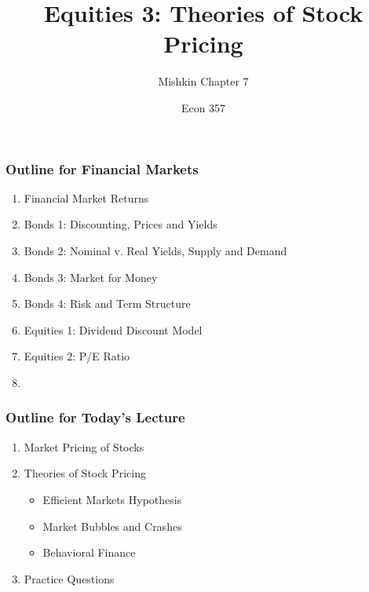 \documentclass{beamer}
\title{Equities 3: Theories of Stock Pricing}
\subtitle{Mishkin Chapter 7}
\author{Econ 357}
\date{\week}
\begin{document}
\frame{\titlepage}

\begin{frame}
    \frametitle{Outline for Financial Markets}
        \begin{enumerate}
            \item Financial Market Returns
            \item Bonds 1: Discounting, Prices and Yields
            \item Bonds 2: Nominal v. Real Yields, Supply and Demand
            \item Bonds 3: Market for Money
            \item Bonds 4: Risk and Term Structure
            \item Equities 1: Dividend Discount Model
            \item Equities 2: P/E Ratio
            \item {}
            
        \end{enumerate}
\end{frame}


\begin{frame}
    \frametitle{Outline for Today's Lecture}
    \begin{enumerate}
        \item Market Pricing of Stocks
        \item Theories of Stock Pricing
        \begin{itemize}
            \item Efficient Markets Hypothesis
            \item Market Bubbles and Crashes
            \item Behavioral Finance
        \end{itemize}
        \item Practice Questions
    \end{enumerate}

\end{frame}
\end{document}
